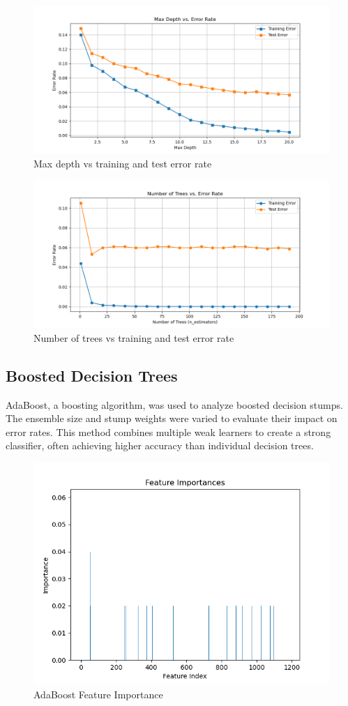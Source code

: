 \documentclass[12pt]{article}
\begin{document}
\begin{figure}[h!]
    \centering
    \includegraphics[width=0.8\linewidth]{figures/Random Forests/Max depth vs error rate.png}
    \caption{Max depth vs training and test error rate}
    \label{fig:mcc}
\end{figure}

\begin{figure}[h!]
    \centering
    \includegraphics[width=0.8\linewidth]{figures/Random Forests/Number of trees vs error rate.png}
    \caption{Number of trees vs training and test error rate}
    \label{fig:mcc}
\end{figure}

\subsection{Boosted Decision Trees}
AdaBoost, a boosting algorithm, was used to analyze boosted decision stumps. The ensemble size and stump weights were varied to evaluate their impact on error rates. This method combines multiple weak learners to create a strong classifier, often achieving higher accuracy than individual decision trees.

\begin{figure}[h!]
    \centering
    \includegraphics[width=0.8\linewidth]{figures/Boosted Trees/Feature Importance.png}
    \caption{AdaBoost Feature Importance}
    \label{fig:mcc}
\end{figure}
\end{document}
